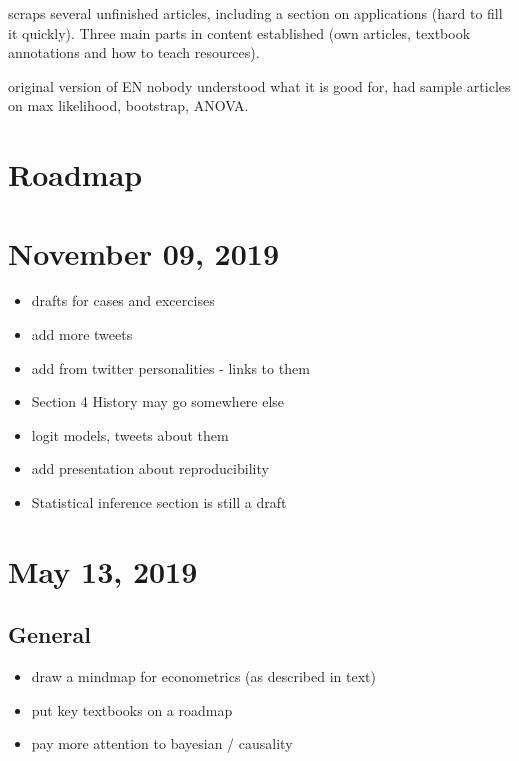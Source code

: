 \documentclass[letterpaper,10pt,english]{sphinxmanual}
\begin{document}
 scraps several unfinished articles, including
a section on applications (hard to fill it quickly). Three main parts
in content established (own articles, textbook annotations and how to
teach resources).

 original version of EN nobody understood what it is good for,
had sample articles on max likelihood, bootstrap, ANOVA.


\section{Roadmap}
\label{\detokenize{roadmap:roadmap}}

\section{November 09, 2019}
\label{\detokenize{roadmap:november-09-2019}}\begin{itemize}
\item {} 
drafts for cases and excercises

\item {} 
add more tweets

\item {} 
add from twitter personalities - links to them

\item {} 
Section 4 History may go somewhere else

\item {} 
logit models, tweets about them

\item {} 
add presentation about reproducibility

\item {} 
Statistical inference section is still a draft

\end{itemize}


\section{May 13, 2019}
\label{\detokenize{roadmap:may-13-2019}}

\subsection{General}
\label{\detokenize{roadmap:general}}\begin{itemize}
\item {} 
draw a mindmap for econometrics (as described in text)

\item {} 
put key textbooks on a roadmap

\item {} 
pay more attention to bayesian / causality

\end{itemize}
\end{document}
